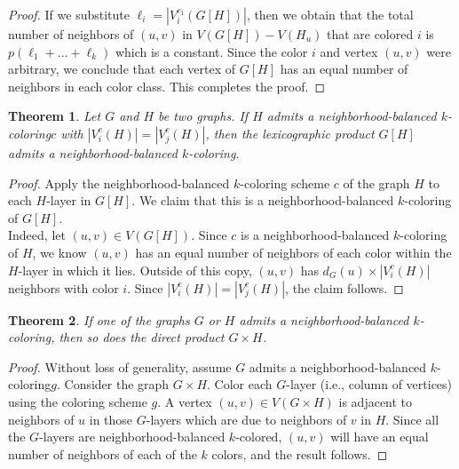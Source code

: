 \documentclass[12pt]{article}
\newtheorem{theorem}{Theorem}[section]
\newcommand{\nbc}{neighborhood-balanced $k$-coloring\xspace}
\newcommand{\nbcd}{neighborhood-balanced $k$-colored\xspace}
\begin{document}
\begin{proof}
    If we substitute $\ell_i = |V_i^{c_1}(G[H])|$, then we obtain that the total number of neighbors of $(u,v)$ in $V(G[H]) - V(H_u)$ that are colored $i$ is $p(\ell_1 + \dots + \ell_k)$ which is a constant.
    Since the color $i$ and vertex $(u,v)$ were arbitrary, we conclude that each vertex of $G[H]$ has an equal number of neighbors in each color class.
    This completes the proof.
\end{proof}

\begin{theorem}
    Let $G$ and $H$ be two graphs. If $H$ admits a \nbc $c$ with $|V^c_i(H)|=|V^c_j(H)|$, then the lexicographic product $G[H]$ admits a \nbc.
\end{theorem}
\begin{proof}
    Apply the \nbc scheme $c$  of the graph $H$ to each $H$-layer in $G[H]$. We claim that this is a \nbc of $G[H]$.\\
    Indeed, let $(u,v)\in V(G[H])$.
    Since $c$ is a \nbc of $H$, we know $(u,v)$ has an equal number of neighbors of each color within the $H$-layer in which it lies.
    Outside of this copy, $(u,v)$ has $d_{G}(u) \times |V^{c}_{i}(H)|$ neighbors with color $i$. Since  $|V^c_i(H)|=|V^c_j(H)|$, the claim follows.
 \end{proof}
 
 \begin{theorem}\label{directproduct}
     If one of the graphs $G$ or $H$ admits a \nbc, then so does the direct product $G\times H$.
 \end{theorem}
 \begin{proof}
     Without loss of generality, assume $G$ admits a \nbc $g$. Consider the graph $G\times H$. Color each $ G$-layer (i.e., column of vertices) using the coloring scheme $g$.
     A vertex $(u,v)\in V(G\times H)$ is adjacent to neighbors of $u$ in those $G$-layers which are due to neighbors of $v$ in $H$. Since all the $G$-layers are \nbcd , $(u,v)$ will have an equal number of neighbors of each of the $k$ colors, and the result follows.
 \end{proof}
\end{document}
